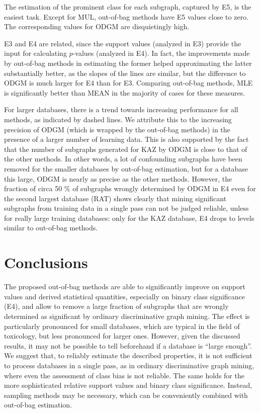 \documentclass{sig-alternate}
\begin{document}
The estimation of the prominent class for each subgraph, captured by E5, is
the easiest task. Except for MUL, out-of-bag methods have E5 values close to
zero. The corresponding values for ODGM are disquietingly high.

E3 and E4 are related, since the support values (analyzed in E3) provide the input
for calculating $p$-values (analyzed in E4). 
In fact, the improvements made by out-of-bag methods in estimating the former helped approximating
the latter substantially better, as the slopes of the lines are similar, but the difference
to ODGM is much larger for E4 than for E3. Comparing out-of-bag methods, MLE is significantly 
better than MEAN in the majority of cases for these measures.

For larger databases, there is a trend towards increasing performance for all
methods, as indicated by dashed lines.  We attribute this to the increasing
precision of ODGM (which is wrapped by the out-of-bag methods) in the presence of a larger number of 
learning data. This is also supported by the fact that the number of subgraphs 
generated for KAZ by ODGM is close to that of the other methods.
In other words, a lot of confounding subgraphs have been removed for the smaller databases by out-of-bag estimation,
but for a database this large, ODGM is nearly as precise as the other methods.
However, the fraction of
circa 50 \% of subgraphs wrongly determined by ODGM in E4 even for the second
largest database (RAT) shows clearly that mining significant subgraphs from training
data in a single pass can not be judged reliable, unless for really large training databases: only for the KAZ database, E4 drops to levels
similar to out-of-bag methods.

\section{Conclusions}
\label{s:Conclusion}
The proposed out-of-bag methods are able to significantly improve on 
support values and derived statistical quantities, especially on binary class significance (E4), and allow to remove a large fraction of subgraphs that are wrongly determined as significant by ordinary
discriminative graph mining. 
The effect is particularly pronounced for small
databases, which are typical in the field of toxicology, but less pronounced for larger ones. 
However, given the discussed results, it may not be possible to tell beforehand if a database is ``large enough''.
We suggest that, to reliably estimate the described properties,
it is not sufficient to process databases in a single pass, as in
ordinary discriminative graph mining, where even the assessment of class bias is
not reliable. 
The same holds for the more sophisticated relative support values and binary class significance.
Instead, sampling methods may be necessary, which can be conveniently combined with out-of-bag estimation.
\end{document}
